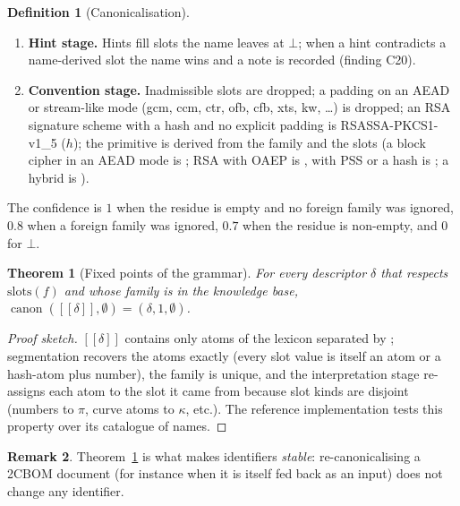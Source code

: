 \documentclass[11pt,a4paper]{article}
\newcommand{\twocbom}{2CBOM}
\newcommand{\sem}[1]{\llbracket #1 \rrbracket}
\newcommand{\llbracket}{[\![}
\newcommand{\rrbracket}{]\!]}
\newcommand{\canon}{\operatorname{canon}}
\theoremstyle{definition}
\newtheorem{definition}{Definition}[section]
\newtheorem{remark}[definition]{Remark}
\theoremstyle{plain}
\newtheorem{theorem}{Theorem}
\begin{document}
\begin{definition}[Canonicalisation]
\begin{enumerate}[nosep]
      a hash atom becomes the hash slot; + becomes the AEAD family;
      two key-establishment families form a hybrid; pre-standard names (,
      , , ) are mapped to the FIPS families with their
      parameter-set renaming (Dilithium 2/3/5 $\mapsto$ ML-DSA 44/65/87) and recorded in the notes.
\item \textbf{Hint stage.} Hints fill slots the name leaves at $\bot$; when a hint contradicts a
      name-derived slot the name wins and a  note is recorded (finding C20).
\item \textbf{Convention stage.} Inadmissible slots are dropped; a padding on an AEAD or
      stream-like mode (gcm, ccm, ctr, ofb, cfb, xts, kw, \ldots) is dropped; an RSA signature
      scheme with a hash and no explicit padding is RSASSA-PKCS1-v1\_5
      ($h$); the primitive is derived from the family and the slots
      (a block cipher in an AEAD mode is ; RSA with OAEP is , with PSS or a
      hash is ; a hybrid is ).
\end{enumerate}
The confidence is $1$ when the residue is empty and no foreign family was ignored, $0.8$ when a
foreign family was ignored, $0.7$ when the residue is non-empty, and $0$ for $\bot$.
\end{definition}

\begin{theorem}[Fixed points of the grammar]\label{thm:fixpoint}
For every descriptor $\delta$ that respects $\mathrm{slots}(f)$ and whose family is in the
knowledge base, $\canon(\sem{\delta}, \emptyset) = (\delta, 1, \emptyset)$.
\end{theorem}
\begin{proof}[Proof sketch]
$\sem{\delta}$ contains only atoms of the lexicon separated by \code{-}; segmentation recovers the
atoms exactly (every slot value is itself an atom or a hash-atom plus number), the family is
unique, and the interpretation stage re-assigns each atom to the slot it came from because slot
kinds are disjoint (numbers to $\pi$, curve atoms to $\kappa$, etc.). The reference
implementation tests this property over its catalogue of names.
\end{proof}

\begin{remark}
Theorem~\ref{thm:fixpoint} is what makes identifiers \emph{stable}: re-canonicalising a
\twocbom{} document (for instance when it is itself fed back as an input) does not change any
identifier.
\end{remark}
\end{document}
